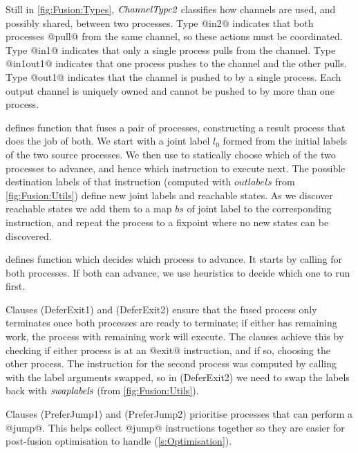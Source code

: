 Still in \cref{fig:Fusion:Types}, $\textit{ChannelType2}$ classifies how channels are used, and possibly shared, between two processes.
Type @in2@ indicates that both processes @pull@ from the same channel, so these actions must be coordinated.
Type @in1@ indicates that only a single process pulls from the channel.
Type @in1out1@ indicates that one process pushes to the channel and the other pulls.
Type @out1@ indicates that the channel is pushed to by a single process.
Each output channel is uniquely owned and cannot be pushed to by more than one process.





\smallskip
 defines function  that fuses a pair of processes, constructing a result process that does the job of both. We start with a joint label $l_0$ formed from the initial labels of the two source processes. We then use  to statically choose which of the two processes to advance, and hence which instruction to execute next. The possible destination labels of that instruction (computed with $outlabels$ from \cref{fig:Fusion:Utils}) define new joint labels and reachable states. As we discover reachable states we add them to a map $bs$ of joint label to the corresponding instruction, and repeat the process to a fixpoint where no new states can be discovered.



 defines function  which decides which process to advance. It starts by calling  for both processes. If both can advance, we use heuristics to decide which one to run first.

Clauses (DeferExit1) and (DeferExit2) ensure that the fused process only terminates once both processes are ready to terminate; if either has remaining work, the process with remaining work will execute.
The clauses achieve this by checking if either process is at an @exit@ instruction, and if so, choosing the other process.
The instruction for the second process was computed by calling  with the label arguments swapped, so in (DeferExit2) we need to swap the labels back with $\textit{swaplabels}$ (from \cref{fig:Fusion:Utils}).

Clauses (PreferJump1) and (PreferJump2) prioritise processes that can perform a @jump@.
This helps collect @jump@ instructions together so they are easier for post-fusion optimisation to handle (\cref{s:Optimisation}).

